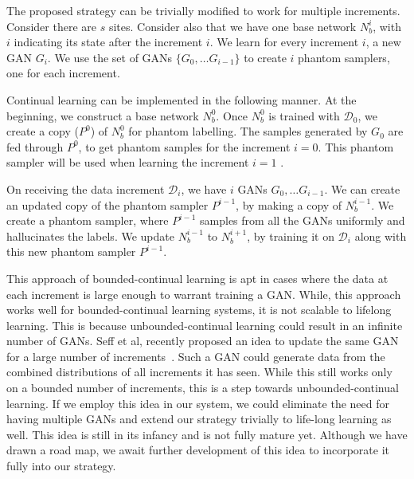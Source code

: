 \documentclass[10pt,twocolumn,letterpaper]{article}
\def \cD{{\mathcal{D}}}
\begin{document}
	The proposed strategy can be trivially modified to work for multiple increments.
	Consider there are $s$ sites.
	Consider also that we have one base network $N_b^i$, with $i$ indicating its state after the increment $i$.
	We learn for every increment $i$, a new GAN $G_i$. 
	We use the set of GANs $\{G_0, \dots G_{i-1}\}$ to create $i$ phantom samplers, one for each increment. 
	
	Continual learning can be implemented in the following manner.
	At the beginning, we construct a base network $N_b^0$. 
	Once $N_b^0$ is trained with $\cD_0$, we create a copy ($P^0$) of $N_b^0$ for phantom labelling.
	The samples generated by $G_0$ are fed through $P^0$, to get phantom samples for the increment $i = 0$.
	This phantom sampler will be used when learning the increment $i=1$ .
	
	On receiving the data increment $\cD_i$, we have $i$ GANs $G_0, \dots G_{i-1}$.
	We can create an updated copy of the phantom sampler $P^{i-1}$, by making a copy of $N_b^{i-1}$. 
	We create a phantom sampler, where $P^{i-1}$ samples from all the GANs uniformly and hallucinates the labels. 
	We update $N_b^{i-1}$ to $N_b^{i+1}$, by training it on $\cD_i$ along with this new phantom sampler $P^{i-1}$.
	
	This approach of bounded-continual learning is apt in cases where the data at each increment is large enough to warrant training a GAN. 
	While, this approach works well for bounded-continual learning systems, it is not scalable to lifelong learning. 
	This is because unbounded-continual learning could result in an infinite number of GANs. 
	Seff et al, recently proposed an idea to update the same GAN for a large number of increments~\cite{seff2017continual}.
	Such a GAN could generate data from the combined distributions of all increments it has seen. 
	While this still works only on a bounded number of increments, this is a step towards unbounded-continual learning.
	If we employ this idea in our system, we could eliminate the need for having multiple GANs and extend our strategy trivially to life-long learning as well. 
	This idea is still in its infancy and is not fully mature yet.
	Although we have drawn a road map, we await further development of this idea to incorporate it fully into our strategy.
	
	\label{sec:continual}
\end{document}
